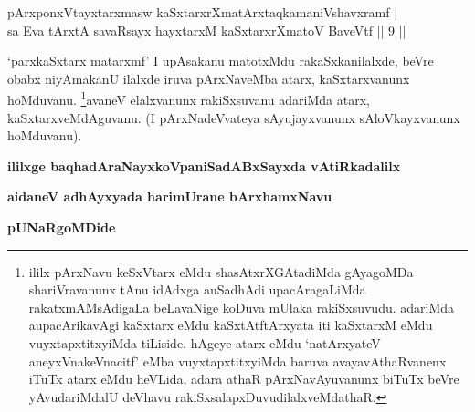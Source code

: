 
\begin{shl}
pArxponxVtayxtarxmasw kaSxtarxrXmatArxtaqkamaniVshavxramf | \\
sa Eva tArxtA savaRsayx hayxtarxM kaSxtarxrXmatoV BaveVtf \hfill ||  9 ||
\end{shl}


\begin{artha}
`parxkaSxtarx matarxmf' I upAsakanu matotxMdu rakaSxkanilalxde, beVre obabx niyAmakanU ilalxde iruva pArxNaveMba atarx, kaSxtarxvanunx hoMduvanu. \footnote{ililx pArxNavu keSxVtarx eMdu shasAtxrXGAtadiMda gAyagoMDa shariVravanunx tAnu idAdxga auSadhAdi upacAragaLiMda rakatxmAMsAdigaLa beLavaNige koDuva mUlaka rakiSxsuvudu. adariMda aupacArikavAgi kaSxtarx eMdu kaSxtAtftArxyata iti kaSxtarxM eMdu vuyxtapxtitxyiMda tiLiside. hAgeye atarx eMdu `natArxyateV aneyxVnakeVnacitf' eMba vuyxtapxtitxyiMda baruva avayavAthaRvanenx iTuTx atarx eMdu heVLida, adara athaR pArxNavAyuvanunx biTuTx beVre yAvudariMdalU deVhavu rakiSxsalapxDuvudilalxveMdathaR.}avaneV elalxvanunx rakiSxsuvanu adariMda atarx, kaSxtarxveMdAguvanu. (I pArxNadeVvateya sAyujayxvanunx sAloVkayxvanunx hoMduvanu).
\end{artha}

\begin{center}
{\bf ililxge baqhadAraNayxkoVpaniSadABxSayxda vAtiRkadalilx}

\smallskip
{\bf aidaneV adhAyxyada harimUrane bArxhamxNavu}

\smallskip
{\bf pUNaRgoMDide}
\end{center}

